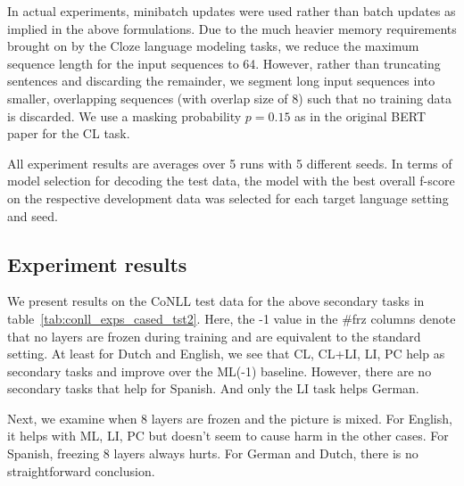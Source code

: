 \documentclass[letterpaper]{article} \usepackage{aaai20}  \usepackage{times}  \usepackage{helvet} \usepackage{courier}  \usepackage[hyphens]{url}  \usepackage{graphicx} \urlstyle{rm} \def\UrlFont{\rm}  \usepackage{graphicx}  \frenchspacing  \setlength{\pdfpagewidth}{8.5in}  \setlength{\pdfpageheight}{11in}  \usepackage{amsmath}
\begin{document}
In actual experiments, minibatch updates were used rather than batch updates as implied in the above formulations.
Due to the much heavier memory requirements brought on by the Cloze language modeling tasks, we reduce the maximum sequence length for the input sequences to 64. However, rather than truncating sentences and discarding the remainder, we segment long input sequences into smaller, overlapping sequences (with overlap size of 8) such that no training data is discarded. We use a masking probability $p=0.15$ as in the original BERT paper for the CL task.

All experiment results are averages over 5 runs with 5 different seeds. In terms of model selection for decoding the test data, the model with the best overall f-score on the respective development data was selected for each target language setting and seed.

\subsection{Experiment results}
We present results on the CoNLL test data for the above secondary tasks in table~\ref{tab:conll_exps_cased_tst2}. Here, the -1 value in the \#frz columns denote that no layers are frozen during training and are equivalent to the standard setting. At least for Dutch and English, we see that CL, CL+LI, LI, PC help as secondary tasks and improve over the ML(-1) baseline. However, there are no secondary tasks that help for Spanish. And only the LI task helps German. 

Next, we examine when 8 layers are frozen and the picture is mixed. For English, it helps with ML, LI, PC but doesn't seem to cause harm in the other cases. For Spanish, freezing 8 layers always hurts. For German and Dutch, there is no straightforward conclusion.
\end{document}

